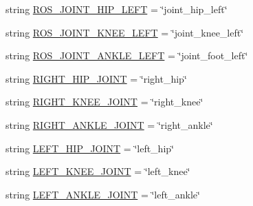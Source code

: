 \begin{DoxyCompactItemize}
\item 
string \mbox{\hyperlink{namespacepedal__simulation__interpolation__cubic__derivative_a6f9e3fd503a3e458136397662c906500}{R\+O\+S\+\_\+\+J\+O\+I\+N\+T\+\_\+\+H\+I\+P\+\_\+\+L\+E\+FT}} = \char`\"{}joint\+\_\+hip\+\_\+left\char`\"{}
\item 
string \mbox{\hyperlink{namespacepedal__simulation__interpolation__cubic__derivative_a5c57e261203d61b137f8c0f63dd70358}{R\+O\+S\+\_\+\+J\+O\+I\+N\+T\+\_\+\+K\+N\+E\+E\+\_\+\+L\+E\+FT}} = \char`\"{}joint\+\_\+knee\+\_\+left\char`\"{}
\item 
string \mbox{\hyperlink{namespacepedal__simulation__interpolation__cubic__derivative_abc7f6cec05b87f791fee83eb74980f62}{R\+O\+S\+\_\+\+J\+O\+I\+N\+T\+\_\+\+A\+N\+K\+L\+E\+\_\+\+L\+E\+FT}} = \char`\"{}joint\+\_\+foot\+\_\+left\char`\"{}
\item 
string \mbox{\hyperlink{namespacepedal__simulation__interpolation__cubic__derivative_ab7526d770fd7644fb4ae9877e2e5a0a4}{R\+I\+G\+H\+T\+\_\+\+H\+I\+P\+\_\+\+J\+O\+I\+NT}} = \char`\"{}right\+\_\+hip\char`\"{}
\item 
string \mbox{\hyperlink{namespacepedal__simulation__interpolation__cubic__derivative_aa114b9878d6a2c2217f63815a71b8947}{R\+I\+G\+H\+T\+\_\+\+K\+N\+E\+E\+\_\+\+J\+O\+I\+NT}} = \char`\"{}right\+\_\+knee\char`\"{}
\item 
string \mbox{\hyperlink{namespacepedal__simulation__interpolation__cubic__derivative_aa168535cfe5c5c0f1d238d2558fa1431}{R\+I\+G\+H\+T\+\_\+\+A\+N\+K\+L\+E\+\_\+\+J\+O\+I\+NT}} = \char`\"{}right\+\_\+ankle\char`\"{}
\item 
string \mbox{\hyperlink{namespacepedal__simulation__interpolation__cubic__derivative_ab0985b6c554bba4c51460ccc2e72409a}{L\+E\+F\+T\+\_\+\+H\+I\+P\+\_\+\+J\+O\+I\+NT}} = \char`\"{}left\+\_\+hip\char`\"{}
\item 
string \mbox{\hyperlink{namespacepedal__simulation__interpolation__cubic__derivative_ab75a384144342f49e9b0a6607162902f}{L\+E\+F\+T\+\_\+\+K\+N\+E\+E\+\_\+\+J\+O\+I\+NT}} = \char`\"{}left\+\_\+knee\char`\"{}
\item 
string \mbox{\hyperlink{namespacepedal__simulation__interpolation__cubic__derivative_afb5c7e31d8be3b45d589b829782a7aa1}{L\+E\+F\+T\+\_\+\+A\+N\+K\+L\+E\+\_\+\+J\+O\+I\+NT}} = \char`\"{}left\+\_\+ankle\char`\"{}
\item 

\end{DoxyCompactItemize}

